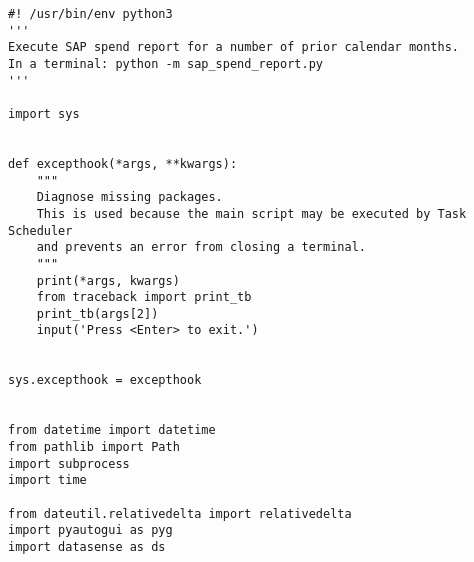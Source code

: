 \documentclass[10pt, letterpaper, twoside]{article}
\begin{document}
\begin{footnotesize}
\begin{verbatim}
#! /usr/bin/env python3
'''
Execute SAP spend report for a number of prior calendar months.
In a terminal: python -m sap_spend_report.py
'''

import sys


def excepthook(*args, **kwargs):
    """
    Diagnose missing packages.
    This is used because the main script may be executed by Task Scheduler
    and prevents an error from closing a terminal.
    """
    print(*args, kwargs)
    from traceback import print_tb
    print_tb(args[2])
    input('Press <Enter> to exit.')


sys.excepthook = excepthook


from datetime import datetime
from pathlib import Path
import subprocess
import time

from dateutil.relativedelta import relativedelta
import pyautogui as pyg
import datasense as ds



\end{verbatim}
\end{footnotesize}
\end{document}
